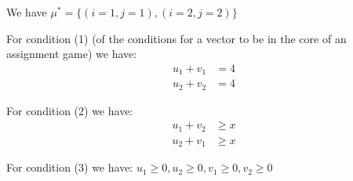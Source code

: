 \documentclass{article}
\begin{document}
\begin{enumerate}
\begin{enumerate}

    We have $\mu^{*} = \{(i=1, j=1), (i=2, j=2)\}$

    For condition (1) (of the conditions for a vector to be in the core of an assignment game) we have:
    \begin{align*}
    u_{1} + v_{1} &= 4 \\
    u_{2} + v_{2} &= 4
    \end{align*}

    For condition (2) we have:
    \begin{align*}
    u_{1} + v_{2} &\ge x \\
    u_{2} + v_{1} &\ge x
    \end{align*}
    
    For condition (3) we have: $u_{1} \ge 0, u_{2} \ge 0, v_{1} \ge 0, v_{2} \ge 0$ \\


\end{enumerate}
\end{enumerate}
\end{document}
